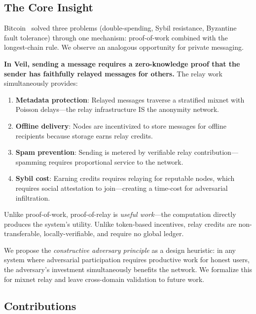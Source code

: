 \documentclass[11pt,a4paper]{article}
\begin{document}
\subsection{The Core Insight}

Bitcoin~\cite{bitcoin} solved three problems (double-spending, Sybil resistance, Byzantine fault tolerance) through one mechanism: proof-of-work combined with the longest-chain rule. We observe an analogous opportunity for private messaging.

\textbf{In Veil, sending a message requires a zero-knowledge proof that the sender has faithfully relayed messages for others.} The relay work simultaneously provides:

\begin{enumerate}[nosep]
    \item \textbf{Metadata protection}: Relayed messages traverse a stratified mixnet with Poisson delays---the relay infrastructure IS the anonymity network.
    \item \textbf{Offline delivery}: Nodes are incentivized to store messages for offline recipients because storage earns relay credits.
    \item \textbf{Spam prevention}: Sending is metered by verifiable relay contribution---spamming requires proportional service to the network.
    \item \textbf{Sybil cost}: Earning credits requires relaying for reputable nodes, which requires social attestation to join---creating a time-cost for adversarial infiltration.
\end{enumerate}

Unlike proof-of-work, proof-of-relay is \emph{useful work}---the computation directly produces the system's utility. Unlike token-based incentives, relay credits are non-transferable, locally-verifiable, and require no global ledger.

We propose the \emph{constructive adversary principle} as a design heuristic: in any system where adversarial participation requires productive work for honest users, the adversary's investment simultaneously benefits the network. We formalize this for mixnet relay and leave cross-domain validation to future work.

\subsection{Contributions}
\end{document}
